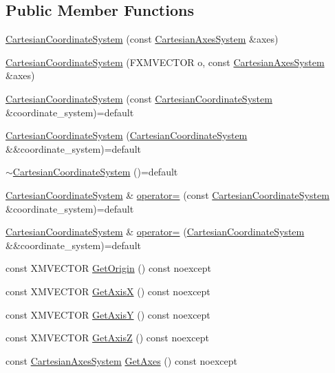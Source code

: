 \subsection*{Public Member Functions}
\begin{DoxyCompactItemize}
\item 
\hyperlink{structmage_1_1_cartesian_coordinate_system_a3f4a3309daccc818f06400a44f70b09b}{Cartesian\+Coordinate\+System} (const \hyperlink{structmage_1_1_cartesian_axes_system}{Cartesian\+Axes\+System} \&axes)
\item 
\hyperlink{structmage_1_1_cartesian_coordinate_system_a31a41ba970f47274c05a6b73b57a5f8f}{Cartesian\+Coordinate\+System} (F\+X\+M\+V\+E\+C\+T\+OR o, const \hyperlink{structmage_1_1_cartesian_axes_system}{Cartesian\+Axes\+System} \&axes)
\item 
\hyperlink{structmage_1_1_cartesian_coordinate_system_a1f580b96edaae45356510208c187c1e2}{Cartesian\+Coordinate\+System} (const \hyperlink{structmage_1_1_cartesian_coordinate_system}{Cartesian\+Coordinate\+System} \&coordinate\+\_\+system)=default
\item 
\hyperlink{structmage_1_1_cartesian_coordinate_system_addc5cb01c6b990d1badb067da28e62bc}{Cartesian\+Coordinate\+System} (\hyperlink{structmage_1_1_cartesian_coordinate_system}{Cartesian\+Coordinate\+System} \&\&coordinate\+\_\+system)=default
\item 
\hyperlink{structmage_1_1_cartesian_coordinate_system_a86effcef63e455323c194063c0f1fd46}{$\sim$\+Cartesian\+Coordinate\+System} ()=default
\item 
\hyperlink{structmage_1_1_cartesian_coordinate_system}{Cartesian\+Coordinate\+System} \& \hyperlink{structmage_1_1_cartesian_coordinate_system_acf9dab4edc5c07b5bbf6bee0bdfe317c}{operator=} (const \hyperlink{structmage_1_1_cartesian_coordinate_system}{Cartesian\+Coordinate\+System} \&coordinate\+\_\+system)=default
\item 
\hyperlink{structmage_1_1_cartesian_coordinate_system}{Cartesian\+Coordinate\+System} \& \hyperlink{structmage_1_1_cartesian_coordinate_system_afc51347ff3f42576c483c76f5747c4c6}{operator=} (\hyperlink{structmage_1_1_cartesian_coordinate_system}{Cartesian\+Coordinate\+System} \&\&coordinate\+\_\+system)=default
\item 
const X\+M\+V\+E\+C\+T\+OR \hyperlink{structmage_1_1_cartesian_coordinate_system_add81a0efb47b0aa4084d803ba1a684e6}{Get\+Origin} () const noexcept
\item 
const X\+M\+V\+E\+C\+T\+OR \hyperlink{structmage_1_1_cartesian_coordinate_system_a00947f77f6af53596d00ee76e0486430}{Get\+AxisX} () const noexcept
\item 
const X\+M\+V\+E\+C\+T\+OR \hyperlink{structmage_1_1_cartesian_coordinate_system_a5e625320f8d7c3b0c46fe89c51d9e8ec}{Get\+AxisY} () const noexcept
\item 
const X\+M\+V\+E\+C\+T\+OR \hyperlink{structmage_1_1_cartesian_coordinate_system_a9d5c1cc1fa21ea0ac79054acfb676a24}{Get\+AxisZ} () const noexcept
\item 
const \hyperlink{structmage_1_1_cartesian_axes_system}{Cartesian\+Axes\+System} \hyperlink{structmage_1_1_cartesian_coordinate_system_ae329f2a0d4d3a4c96d745d3af10fcaad}{Get\+Axes} () const noexcept
\end{DoxyCompactItemize}
